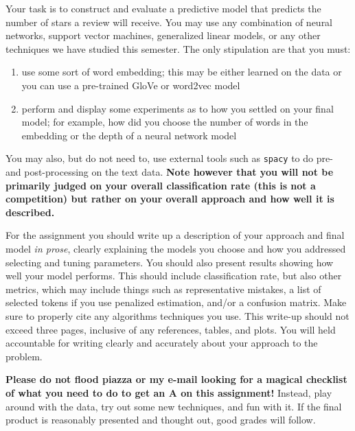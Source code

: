 \documentclass[12pt]{article}
\begin{document}
Your task is to construct and evaluate a predictive model that predicts the
number of stars a review will receive. You may use any combination of neural networks,
support vector machines, generalized linear models, or any other techniques we
have studied this semester. The only stipulation are that you must:
\begin{enumerate}
\item use some sort of word embedding; this may be either learned on the data or
you can use a pre-trained GloVe or word2vec model
\item perform and display some experiments as to how you settled on your final
model; for example, how did you choose the number of words in the embedding or
the depth of a neural network model
\end{enumerate}
You may also, but do not need to, use external tools such as \texttt{spacy} to
do pre- and post-processing on the text data. \textbf{Note however that you
will not be primarily judged on your overall classification rate (this is not
a competition) but rather on your overall approach and how well it is described.}

For the assignment you should write up a description of your approach and final
model \textit{in prose}, clearly explaining the models you choose and how you
addressed selecting and tuning parameters. You should also present results
showing how well your model performs. This should include classification rate,
but also other metrics, which may include things such as representative mistakes,
a list of selected tokens if you use penalized estimation, and/or a confusion
matrix. Make sure to properly cite any algorithms techniques you use. This write-up
should not exceed three pages, inclusive of any references, tables, and plots.
You will held accountable for writing clearly and accurately about your approach
to the problem.

\textbf{Please do not flood piazza or my e-mail looking for a magical checklist
of what you need to do to get an A on this assignment!} Instead, play around with
the data, try out some new techniques, and fun with it. If the final product is
reasonably presented and thought out, good grades will follow.
\end{document}
